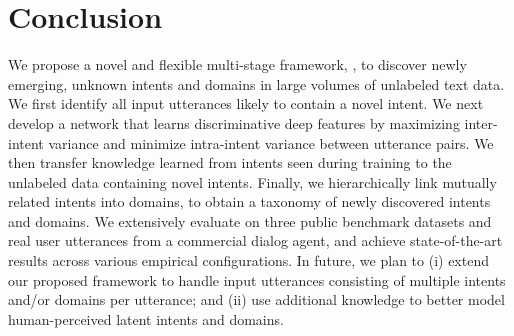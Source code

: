 \section{Conclusion}

We propose a novel and flexible multi-stage framework, \mname{}, to discover newly emerging, unknown intents and domains in large volumes of unlabeled text data. We first identify all input utterances likely to contain a novel intent. We next develop a network that learns discriminative deep features by maximizing inter-intent variance and minimize intra-intent variance between utterance pairs. We then transfer knowledge learned from intents seen during training to the unlabeled data containing novel intents. Finally, we hierarchically link mutually related intents into domains, to obtain a taxonomy of newly discovered intents and domains. We extensively evaluate \mname{} on three public benchmark datasets and real user utterances from a commercial dialog agent, and achieve state-of-the-art results across various empirical configurations. In future, we plan to (i) extend our proposed framework to handle input utterances consisting of multiple intents and/or domains per utterance; and (ii) use additional knowledge to better model human-perceived latent intents and domains.
